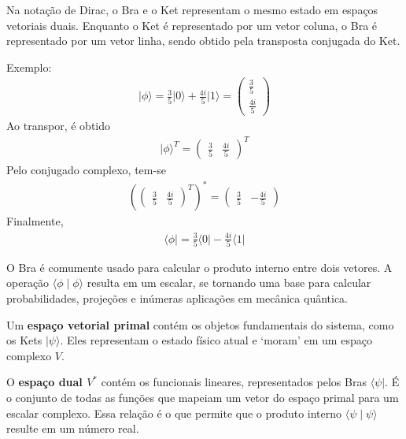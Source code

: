 \documentclass[12pt, a4paper]{article}
\newcommand{\ket}[1]{\lvert #1 \rangle}
\newcommand{\bra}[1]{\langle #1 \rvert}
\newcommand{\braket}[2]{\langle #1 \mid #2 \rangle}
\begin{document}
Na notação de Dirac, o Bra e o Ket representam o mesmo estado em espaços vetoriais duais. Enquanto o Ket é representado por um vetor coluna, o Bra é representado por um vetor linha, sendo obtido pela transposta conjugada do Ket. 


Exemplo:\[
    \begin{aligned}
        \ket{\phi} = 
        \frac{3}{5}\ket{0} + \frac{4i}{5}\ket{1} = 
        \begin{pmatrix}
            \frac{3}{5} \\[1ex]
            \frac{4i}{5}
        \end{pmatrix}
    \end{aligned}
\]
Ao transpor, é obtido \[
    \begin{aligned}
        \ket{\phi}^T = 
        \begin{pmatrix}
            \frac{3}{5} & \frac{4i}{5}
        \end{pmatrix}^T
    \end{aligned}
\]
Pelo conjugado complexo, tem-se \[
    \begin{aligned}
        (\begin{pmatrix}
            \frac{3}{5} & \frac{4i}{5}
        \end{pmatrix}^T)^*
        = 
        \begin{pmatrix}
            \frac{3}{5} & -\frac{4i}{5}
        \end{pmatrix}
    \end{aligned}
\]
Finalmente, \[
    \begin{aligned}
        \bra{\phi} = \frac{3}{5}\bra{0} - \frac{4i}{5}\bra{1}
    \end{aligned}
\]

O Bra é comumente usado para calcular o produto interno entre dois vetores. A operação \(\braket{\phi}{\phi}\) resulta em um escalar, se tornando uma base para calcular probabilidades, projeções e inúmeras aplicações em mecânica quântica.

Um \textbf{espaço vetorial primal} contém os objetos fundamentais do sistema, como os Kets $\ket{\psi}$. Eles representam o estado físico atual e `moram' em um espaço complexo $V$.

O \textbf{espaço dual $V^*$} contém os funcionais lineares, representados pelos Bras $\bra{\psi}$. É o conjunto de todas as funções que mapeiam um vetor do espaço primal para um escalar complexo. Essa relação é o que permite que o produto interno $\braket{\psi}{\psi}$ resulte em um número real.
\end{document}
